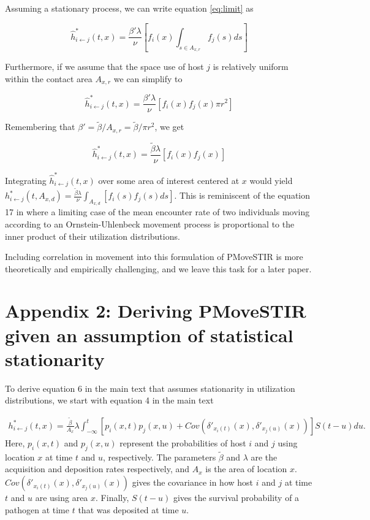 \documentclass[letterpaper]{article}
\begin{document}
Assuming a stationary process, we can write equation \ref{eq:limit} as

\begin{equation}
    \hat{h}^*_{i \leftarrow j}(t, x) =  \frac{\beta' \lambda}{\nu} [f_i(x) \int_{s \in A_{x, r}} f_j(s) ds]
\end{equation}

Furthermore, if we assume that the space use of host $j$ is relatively uniform within the contact area $A_{x, r}$ we can simplify to

\begin{equation}
    \hat{h}^*_{i \leftarrow j}(t, x) =  \frac{\beta' \lambda}{\nu} [f_i(x) f_j(x) \pi r^2]
\end{equation}

Remembering that $\beta' = \tilde{\beta} / A_{x, r} = \tilde{\beta} / \pi r^2$, we get 

\begin{equation}
    \hat{h}^*_{i \leftarrow j}(t, x) =  \frac{\tilde{\beta} \lambda}{\nu} [f_i(x) f_j(x)]
\end{equation}

Integrating $\hat{h}^*_{i \leftarrow j}(t, x)$ over some area of interest centered at $x$ would yield  $h^*_{i \leftarrow j}(t, A_{x, d}) = \frac{\tilde{\beta} \lambda}{\nu} \int_{A_{x, d}} [f_i(s) f_j(s) ds] $. This is reminiscent of the equation 17 in \cite{Martinez-Garcia2020} where a limiting case of the mean encounter rate of two individuals moving according to an Ornstein-Uhlenbeck movement process is proportional to the inner product of their utilization distributions. 

Including correlation in movement into this formulation of PMoveSTIR is more theoretically and empirically challenging, and we leave this task for a later paper.

\section*{Appendix 2: Deriving PMoveSTIR given an assumption of statistical stationarity}

To derive equation 6 in the main text that assumes stationarity in utilization distributions, we start with equation 4 in the main text

\begin{equation}
    \begin{aligned}
        h^*_{i \leftarrow j}(t, x) = \frac{\tilde{\beta}}{A_x} \lambda \int_{-\infty}^{t} [p_i(x, t) p_j(x, u) + Cov(\delta'_{x_i(t)}(x), \delta'_{x_j(u)}(x))] S(t - u) du.
    \end{aligned}
    \label{eq:foi_cov}
\end{equation}
Here, $p_i(x, t)$ and $p_j(x, u)$ represent the probabilities of host $i$ and $j$ using location $x$ at time $t$ and $u$, respectively. The parameters $\tilde{\beta}$ and $\lambda$ are the acquisition and deposition rates respectively, and $A_x$ is the area of location $x$.  $Cov(\delta'_{x_i(t)}(x), \delta'_{x_j(u)}(x))$ gives the covariance in how host $i$ and $j$ at time $t$ and $u$ are using area $x$.  Finally, $S(t - u)$  gives the survival probability of a pathogen at time $t$ that was deposited at time $u$. 
\end{document}

